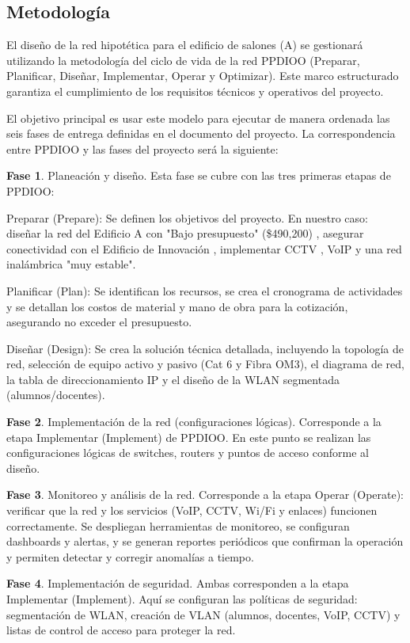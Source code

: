 \subsection{Metodología}

El diseño de la red hipotética para el edificio de salones (A) se gestionará utilizando la metodología del ciclo de vida de la red PPDIOO (Preparar, Planificar, Diseñar, Implementar, Operar y Optimizar). Este marco estructurado garantiza el cumplimiento de los requisitos técnicos y operativos del proyecto.

El objetivo principal es usar este modelo para ejecutar de manera ordenada las seis fases de entrega definidas en el documento del proyecto. La correspondencia entre PPDIOO y las fases del proyecto será la siguiente:

\textbf{Fase 1}. Planeación y diseño. Esta fase se cubre con las tres primeras etapas de PPDIOO:

Preparar (Prepare): Se definen los objetivos del proyecto. En nuestro caso: diseñar la red del Edificio A con "Bajo presupuesto" (\$490,200) , asegurar conectividad con el Edificio de Innovación , implementar CCTV , VoIP y una red inalámbrica "muy estable".

Planificar (Plan): Se identifican los recursos, se crea el cronograma de actividades y se detallan los costos de material y mano de obra para la cotización, asegurando no exceder el presupuesto.

Diseñar (Design): Se crea la solución técnica detallada, incluyendo la topología de red, selección de equipo activo y pasivo (Cat 6 y Fibra OM3), el diagrama de red, la tabla de direccionamiento IP y el diseño de la WLAN segmentada (alumnos/docentes).

\textbf{Fase 2}. Implementación de la red (configuraciones lógicas). Corresponde a la etapa Implementar (Implement) de PPDIOO. En este punto se realizan las configuraciones lógicas de switches, routers y puntos de acceso conforme al diseño.

\textbf{Fase 3}. Monitoreo y análisis de la red. Corresponde a la etapa Operar (Operate): verificar que la red y los servicios (VoIP, CCTV, Wi\-/Fi y enlaces) funcionen correctamente. Se despliegan herramientas de monitoreo, se configuran dashboards y alertas, y se generan reportes periódicos que confirman la operación y permiten detectar y corregir anomalías a tiempo.

\textbf{Fase 4}. Implementación de seguridad. Ambas corresponden a la etapa Implementar (Implement). Aquí se configuran las políticas de seguridad: segmentación de WLAN, creación de VLAN (alumnos, docentes, VoIP, CCTV) y listas de control de acceso para proteger la red.

